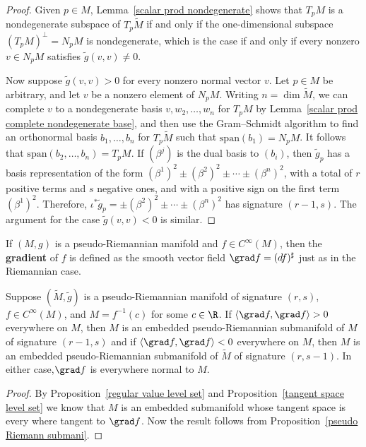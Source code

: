 \begin{proof}
Given $p\in M$, Lemma~\ref{scalar prod nondegenerate} shows that $T_pM$ is 
a nondegenerate subspace of $T_p\widetilde{M}$ if and only if the one-dimensional 
subspace $(T_pM)^{\bot}=N_pM$ is nondegenerate, which is the case if and only 
if every nonzero $v\in N_pM$ satisfies $\widetilde{g}(v,v)\neq 0$.\par
Now suppose $\widetilde{g}(v,v)>0$ for every nonzero normal vector $v$. Let 
$p\in M$ be arbitrary, and let $v$ be a nonzero element of $N_pM$. Writing 
$n=\dim \widetilde{M}$, we can complete $v$ to a nondegenerate basis $v,w_2,\dots,w_n$ 
for $T_pM$ by Lemma~\ref{scalar prod complete nondegenerate base}, and then 
use the Gram–Schmidt algorithm to find an orthonormal basis $b_1,\dots,b_n$ for $T_p\widetilde{M}$ 
such that $\mathrm{span}(b_1)=N_pM$. It follows that $\mathrm{span}(b_2,\dots,b_n)=T_pM$. 
If $(\beta^j)$ is the dual basis to $(b_i)$, then $\widetilde{g}_p$ has a 
basis representation of the form $(\beta^1)^2\pm(\beta^2)^2\pm\cdots\pm(\beta^n)^2$, 
with a total of $r$ positive terms and $s$ negative ones, and with a positive 
sign on the first term $(\beta^1)^2$. Therefore, $\iota^*\widetilde{g}_p=\pm(\beta^2)^2\pm\cdots\pm(\beta^n)^2$ 
has signature $(r-1,s)$. The argument for the case $\widetilde{g}(v,v)<0$ is similar.
\end{proof}
If $(M,g)$ is a pseudo-Riemannian manifold and $f\in C^{\infty}(M)$, then 
the \textbf{gradient} of $f$ is defined as the smooth vector field $\grad f=(df)^{\sharp}$ 
just as in the Riemannian case.
\begin{proposition}
Suppose $(\widetilde{M},\widetilde{g})$ is a pseudo-Riemannian manifold of 
signature $(r,s)$, $f\in C^{\infty}(M)$, and $M=f^{-1}(c)$ for some $c\in\R$. 
If $\langle\grad f,\grad f\rangle>0$ everywhere on $M$, then $M$ is an 
embedded pseudo-Riemannian submanifold of $M$ of signature $(r-1,s)$ and if 
$\langle\grad f,\grad f\rangle<0$  everywhere on $M$, then $M$ is an embedded 
pseudo-Riemannian submanifold of $\widetilde{M}$ of signature $(r,s-1)$. In 
either case,$\grad f$ is everywhere normal to $M$.
\end{proposition}
\begin{proof}
By Proposition~\ref{regular value level set} and Proposition~\ref{tangent space level set} 
we know that $M$ is an embedded submanifold whose tangent space is every where tangent to 
$\grad f$. Now the result follows from Proposition~\ref{pseudo Riemann submani}.
\end{proof}
